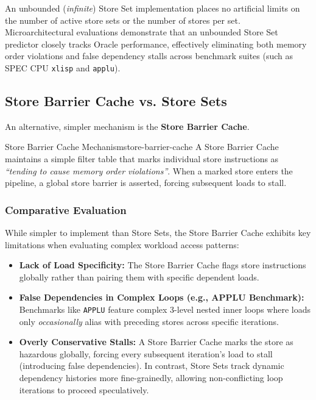 An unbounded (\textit{infinite}) Store Set implementation places no artificial limits on the number of active store sets or the number of stores per set. Microarchitectural evaluations demonstrate that an unbounded Store Set predictor closely tracks Oracle performance, effectively eliminating both memory order violations and false dependency stalls across benchmark suites (such as SPEC CPU \texttt{xlisp} and \texttt{applu}).

\subsection{Store Barrier Cache vs. Store Sets}

An alternative, simpler mechanism is the \textbf{Store Barrier Cache}.

\begin{concept}{Store Barrier Cache Mechanism}{store-barrier-cache}
A Store Barrier Cache maintains a simple filter table that marks individual store instructions as \textit{``tending to cause memory order violations''}. When a marked store enters the pipeline, a global store barrier is asserted, forcing subsequent loads to stall.
\end{concept}

\subsubsection{Comparative Evaluation}
While simpler to implement than Store Sets, the Store Barrier Cache exhibits key limitations when evaluating complex workload access patterns:

\begin{itemize}
    \item \textbf{Lack of Load Specificity:} The Store Barrier Cache flags store instructions globally rather than pairing them with specific dependent loads.
    \item \textbf{False Dependencies in Complex Loops (e.g., APPLU Benchmark):} Benchmarks like \texttt{APPLU} feature complex 3-level nested inner loops where loads only \textit{occasionally} alias with preceding stores across specific iterations.
    \item \textbf{Overly Conservative Stalls:} A Store Barrier Cache marks the store as hazardous globally, forcing every subsequent iteration's load to stall (introducing false dependencies). In contrast, Store Sets track dynamic dependency histories more fine-grainedly, allowing non-conflicting loop iterations to proceed speculatively.
\end{itemize}

